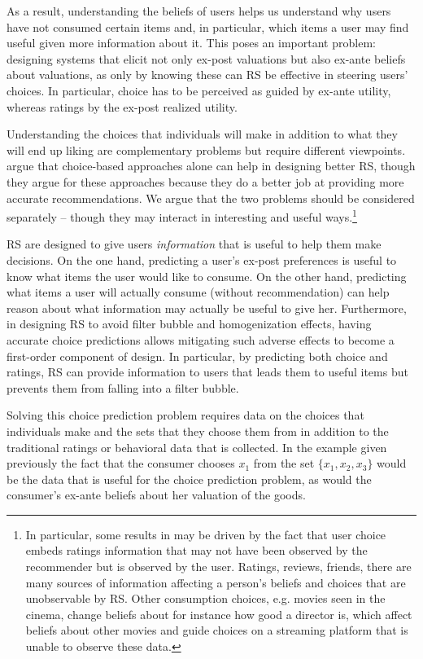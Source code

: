 \documentclass[sigconf]{acmart}
\begin{document}
As a result, understanding the beliefs of users helps us understand why users have not consumed certain items and, in particular, which items a user may find useful given more information about it. This poses an important problem: designing systems that elicit not only ex-post valuations but also ex-ante beliefs about valuations, as only by knowing these can RS be effective in steering users' choices. In particular, choice has to be perceived as guided by ex-ante utility, whereas ratings by the ex-post realized utility.
\par
Understanding the choices that individuals will make in addition to what they will end up liking are complementary problems but require different viewpoints. \cite{jiang2014choice, saavedra2016choice} argue that choice-based approaches alone can help in designing better RS, though they argue for these approaches because they do a better job at providing more accurate recommendations. We argue that the two problems should be considered separately -- though they may interact in interesting and useful ways.\footnote{In particular, some results in \cite{jiang2014choice, saavedra2016choice} may be driven by the fact that user choice embeds ratings information that may not have been observed by the recommender but is observed by the user. Ratings, reviews, friends, there are many sources of information affecting a person's beliefs and choices that are unobservable by RS. Other consumption choices, e.g. movies seen in the cinema, change beliefs about for instance how good a director is, which affect beliefs about other movies and guide choices on a streaming platform that is unable to observe these data.} 
\par
RS are designed to give users \textit{information} that is useful to help them make decisions. On the one hand, predicting a user's ex-post preferences is useful to know what items the user would like to consume. On the other hand, predicting what items a user will actually consume (without recommendation) can help reason about what information may actually be useful to give her. Furthermore, in designing RS to avoid filter bubble and homogenization effects, having accurate choice predictions allows mitigating such adverse effects to become a first-order component of design. In particular, by predicting both choice and ratings, RS can provide information to users that leads them to useful items but prevents them from falling into a filter bubble. 
\par
Solving this choice prediction problem requires data on the choices that individuals make and the sets that they choose them from in addition to the traditional ratings or behavioral data that is collected. In the example given previously the fact that the consumer chooses $x_1$ from the set $\{x_1, x_2, x_3 \}$ would be the data that is useful for the choice prediction problem, as would the consumer's ex-ante beliefs about her valuation of the goods.
\end{document}
